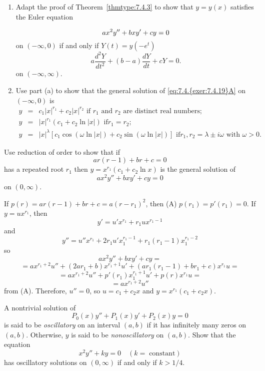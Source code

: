 \documentclass{ximera}
\begin{document}
\begin{problem}\label{exer:7.4.19}
\begin{enumerate}
\item %
Adapt the proof of Theorem~\ref{thmtype:7.4.3} to show that  $y=y(x)$
satisfies the Euler equation

\begin{equation} \label{eq:7.4.{exer:7.4.19}A}
ax^2y''+bxy'+cy=0
\end{equation}
on $(-\infty,0)$
if and only if  $Y(t)=y(-e^t)$
$$
a \frac{d^2Y}{ dt^2}+(b-a)\frac{dY}{ dt}+cY=0.
$$
on   $(-\infty,\infty)$.
\item %
Use part (a)  to show that  the general solution of
\eqref{eq:7.4.{exer:7.4.19}A} on $(-\infty,0)$ is
\begin{eqnarray*}
y&=&c_1|x|^{r_1}+c_2|x|^{r_2}\mbox{ if $r_1$ and $r_2$ are distinct
real numbers;  }
\\ y&=&|x|^{r_1}(c_1+c_2\ln|x|)\mbox{ if
$r_1=r_2$;  }
\\ y&=&|x|^{\lambda}\left[c_1\cos\left(\omega\ln|x|\right)+
c_2\sin\left(\omega\ln|x| \right)\right]\mbox{ if
$r_1,r_2=\lambda\pm i\omega$ with $\omega>0$}.
\end{eqnarray*}
\end{enumerate}
\end{problem}

\begin{problem}\label{exer:7.4.20} Use reduction of order to show that if
$$
ar(r-1)+br+c=0
$$
has a repeated root $r_1$ then $y=x^{r_1}(c_1+c_2\ln x)$ is the
general solution of
$$
ax^2y''+bxy'+cy=0
$$
on $(0,\infty)$.

\begin{solution}
    If $p(r)=ar(r-1)+br+c=a(r-r_1)^2$, then (A) $p(r_1)=p'(r_1)=0$.
If $y=ux^{r_1}$, then $$y'=u'x^{r_1}+r_1ux^{r_1-1}$$
and $$y''=u''x^{r_1}+2r_1u'x_1^{r_1-1}+r_1(r_1-1)x_1^{r_1-2}$$ so
$$
ax^2y''+bxy'+cy=$$
$$=ax^{r_1+2}u''+(2ar_1+b)x^{r_1+1}u'
+\left(ar_1(r_1-1)+br_1+c\right)x^{r_1}u=$$
$$=ax^{r_1+2}u''+p'(r_1)x_1^{r_1+1}u'+p(r)x^{r_1}u=$$
$$=ax^{r_1+2}u''$$
from (A). Therefore, $u''=0$, so $u=c_1+c_2x$ and
$y=x^{r_1}(c_1+c_2x)$.
\end{solution}
\end{problem}

\begin{problem}\label{exer:7.4.21}
  A nontrivial solution of
$$
P_0(x)y''+P_1(x)y'+P_2(x)y=0
$$
is said to be \emph{oscillatory} on an interval $(a,b)$ if it has infinitely
many zeros on $(a,b)$.  Otherwise, $y$ is said to be \emph{nonoscillatory}
on $(a,b)$.  Show that the equation
$$
x^2y''+ky=0 \quad (k=\; \mbox{constant})
$$
has oscillatory solutions on $(0,\infty)$ if and only if $k>1/4$.
\end{problem}
\end{document}
